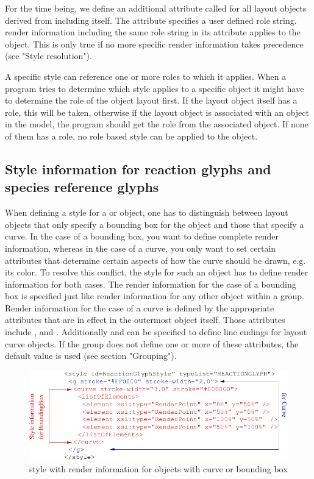 For the time being, we define an additional attribute called  for all 
layout objects derived from \GraphicalObject including \GraphicalObject itself.
The attribute specifies a user defined role string. render information including the same role string in its
 attribute applies to the object. This is only true if no more specific render information
takes precedence (see "Style resolution").
 
A specific style can reference one or more roles to which it applies. When a program tries to determine which style applies to a 
specific object it might have to determine the role of the object layout first. If the 
layout object itself has a role, this will be taken, otherwise if the layout object 
is associated with an object in the model, the program should get the role from 
the associated object. If none of them has a role, no role based style can be 
applied to the object.

\subsection{Style information for reaction glyphs and species reference glyphs}

When defining a style for a \ReactionGlyph or \SpeciesReferenceGlyph object, one 
has to distinguish between layout objects that only specify a bounding box for the 
object and those that specify a curve. In the case of a bounding box, you want to 
define complete render information, whereas in the case of a curve, you only 
want to set certain attributes that determine certain aspects of how the 
curve should be drawn, e.g. its color. To resolve this conflict, the style for such an 
object has to define render information for both cases. The render information 
for the case of a bounding box is specified just like render information for 
any other object within a group. Render information for the case of a curve is 
defined by the appropriate attributes that are in effect in the outermost \Group 
object itself. Those attributes include ,  
and . Additionally  and  can be 
specified to define line endings for layout curve objects. If the group does not define 
one or more of these attributes, the default value is used (see section "Grouping").

\begin{figure}[!ht]
\begin{center}
\includegraphics[scale=0.25]{figures/CurveAndBBStyle}
\end{center}
\caption{style with render information for objects with curve or bounding box}
\label{CurveAndBBStyle}
\end{figure}


